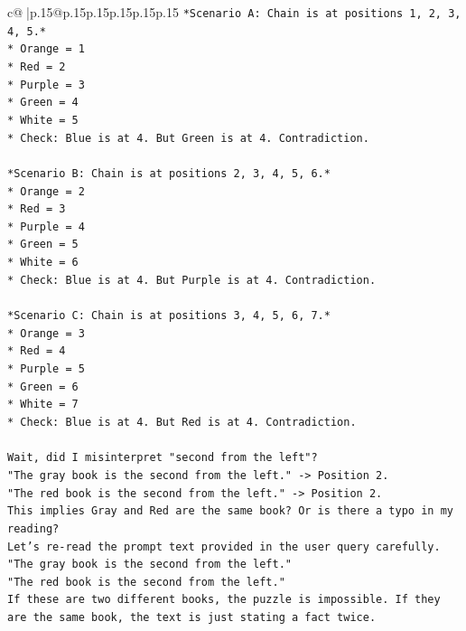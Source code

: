 \documentclass{article}
\begin{document}
{\begin{supertabular}{c@{$\;$}|p{.15\linewidth}@{}p{.15\linewidth}p{.15\linewidth}p{.15\linewidth}p{.15\linewidth}p{.15\linewidth}}
{{{\texttt{*Scenario A: Chain is at positions 1, 2, 3, 4, 5.*} \\
\texttt{*   Orange = 1} \\
\texttt{*   Red = 2} \\
\texttt{*   Purple = 3} \\
\texttt{*   Green = 4} \\
\texttt{*   White = 5} \\
\texttt{*   Check: Blue is at 4. But Green is at 4. Contradiction.} \\
\\ 
\texttt{*Scenario B: Chain is at positions 2, 3, 4, 5, 6.*} \\
\texttt{*   Orange = 2} \\
\texttt{*   Red = 3} \\
\texttt{*   Purple = 4} \\
\texttt{*   Green = 5} \\
\texttt{*   White = 6} \\
\texttt{*   Check: Blue is at 4. But Purple is at 4. Contradiction.} \\
\\ 
\texttt{*Scenario C: Chain is at positions 3, 4, 5, 6, 7.*} \\
\texttt{*   Orange = 3} \\
\texttt{*   Red = 4} \\
\texttt{*   Purple = 5} \\
\texttt{*   Green = 6} \\
\texttt{*   White = 7} \\
\texttt{*   Check: Blue is at 4. But Red is at 4. Contradiction.} \\
\\ 
\texttt{Wait, did I misinterpret "second from the left"?} \\
\texttt{"The gray book is the second from the left." {-}> Position 2.} \\
\texttt{"The red book is the second from the left." {-}> Position 2.} \\
\texttt{This implies Gray and Red are the same book? Or is there a typo in my reading?} \\
\texttt{Let's re{-}read the prompt text provided in the user query carefully.} \\
\texttt{"The gray book is the second from the left."} \\
\texttt{"The red book is the second from the left."} \\
\texttt{If these are two different books, the puzzle is impossible. If they are the same book, the text is just stating a fact twice.} \\
}}}
\end{supertabular}}
\end{document}
